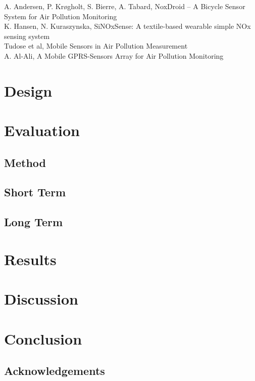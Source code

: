 \documentclass{ituthesis}
\begin{document}
\cite{andersen2012noxdroid} A. Andersen, P. Krøgholt, S. Bierre, A. Tabard, NoxDroid – A Bicycle Sensor System for Air Pollution Monitoring\\

\cite{hansen2010sinox} \cite{hansen2012sinoxsense} K. Hansen, N. Kuraszynska, SiNOxSense: A textile-based wearable simple NOx sensing system\\

\cite{tudose2011mobile} Tudose et al, Mobile Sensors in Air Pollution Measurement\\

\cite{al2010mobile} A. Al-Ali, A Mobile GPRS-Sensors Array for Air Pollution Monitoring\\

\chapter{Design}
\label{ch:design}

\chapter{Evaluation}
\label{ch:evaluation}

	\section{Method}
	\label{sec:evaluation_method}

	\section{Short Term}
	\label{sec:evaluation_short}

	\section{Long Term}
	\label{sec:evaluation_long}

\chapter{Results}
\label{ch:results}

\chapter{Discussion}
\label{ch:discussion}

\chapter{Conclusion}
\label{ch:conclusion}

	\section{Acknowledgements}
	\label{sec:acknowledgements}

\clearpage


\end{document}
